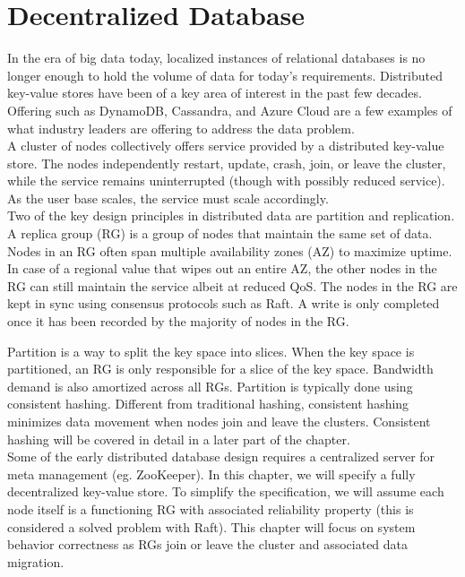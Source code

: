 % 

\usetikzlibrary{arrows.meta} %

\chapter{Decentralized Database}

In the era of big data today, localized instances of relational databases is no
longer enough to hold the volume of data for today's requirements. Distributed
key-value stores have been of a key area of interest in the past few decades. 
Offering such as DynamoDB, Cassandra, and Azure Cloud are a few examples of what
industry leaders are offering to address the data problem.\\

A cluster of nodes collectively offers service provided by a distributed key-value store. The nodes independently restart, update, crash, join, or leave 
the cluster, while the service remains uninterrupted (though with possibly
reduced service). As the user base scales, the service must scale accordingly.\\

Two of the key design principles in distributed data are partition and
replication.\\

A replica group (RG) is a group of nodes that maintain the same set of data.
Nodes in an RG often span multiple availability zones (AZ) to maximize uptime.
In case of a regional value that wipes out an entire AZ, the other nodes in the
RG can still maintain the service albeit at reduced QoS. The nodes in the RG are
kept in sync using consensus protocols such as Raft. A write is only
completed once it has been recorded by the
majority of nodes in the RG.

Partition is a way to split the key space into slices. When the key space is
partitioned, an RG is only responsible for a slice of the key space. Bandwidth
demand is also amortized across all RGs. Partition is typically done using 
consistent hashing. Different from traditional hashing, consistent hashing
minimizes data movement when nodes join and leave the clusters. Consistent
hashing will be covered in detail in a later part of the chapter.\\

Some of the early distributed database design requires a centralized server for
meta management (eg. ZooKeeper). In this chapter, we will specify a fully
decentralized key-value store. To simplify the specification, we will assume 
each node itself is a functioning RG with associated reliability property (this
is considered a solved problem with Raft). This chapter will focus on system
behavior correctness as RGs join or leave the cluster and associated data
migration.

